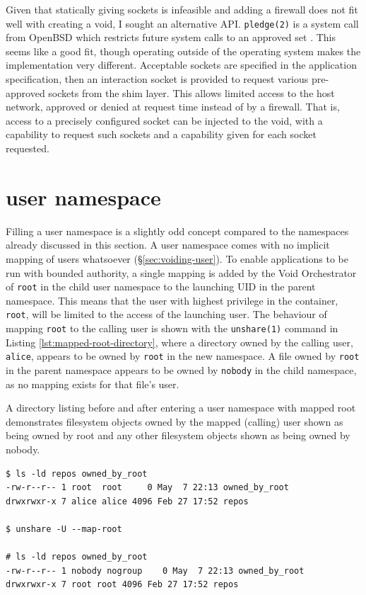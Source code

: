 \documentclass[12pt,a4paper,twoside]{report}
\begin{document}
Given that statically giving sockets is infeasible and adding a firewall does not fit well with creating a void, I sought an alternative API. \texttt{pledge(2)} is a system call from OpenBSD which restricts future system calls to an approved set \citep{the_openbsd_foundation_pledge2_2022}. This seems like a good fit, though operating outside of the operating system makes the implementation very different. Acceptable sockets are specified in the application specification, then an interaction socket is provided to request various pre-approved sockets from the shim layer. This allows limited access to the host network, approved or denied at request time instead of by a firewall. That is, access to a precisely configured socket can be injected to the void, with a capability to request such sockets and a capability given for each socket requested.

\section{user namespace}
\label{sec:filling-user}

Filling a user namespace is a slightly odd concept compared to the namespaces already discussed in this section. A user namespace comes with no implicit mapping of users whatsoever (§\ref{sec:voiding-user}). To enable applications to be run with bounded authority, a single mapping is added by the Void Orchestrator of \texttt{root} in the child user namespace to the launching UID in the parent namespace. This means that the user with highest privilege in the container, \texttt{root}, will be limited to the access of the launching user. The behaviour of mapping \texttt{root} to the calling user is shown with the \texttt{unshare(1)} command in Listing \ref{lst:mapped-root-directory}, where a directory owned by the calling user, \texttt{alice}, appears to be owned by \texttt{root} in the new namespace. A file owned by \texttt{root} in the parent namespace appears to be owned by \texttt{nobody} in the child namespace, as no mapping exists for that file's user.

\begin{listing}
\label{lst:mapped-root-directory}
\caption{A directory listing before and after entering a user namespace with mapped root demonstrates filesystem objects owned by the mapped (calling) user shown as being owned by root and any other filesystem objects shown as being owned by nobody.}

\begin{verbatim}
$ ls -ld repos owned_by_root
-rw-r--r-- 1 root  root     0 May  7 22:13 owned_by_root
drwxrwxr-x 7 alice alice 4096 Feb 27 17:52 repos

$ unshare -U --map-root

# ls -ld repos owned_by_root
-rw-r--r-- 1 nobody nogroup    0 May  7 22:13 owned_by_root
drwxrwxr-x 7 root root 4096 Feb 27 17:52 repos
\end{verbatim}
\end{listing}
\end{document}
